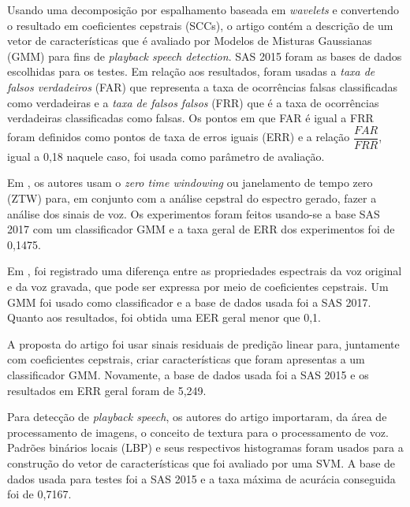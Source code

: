 		\par Usando uma decomposição por espalhamento baseada em \textit{wavelets} e convertendo o resultado em coeficientes cepstrais (SCCs), o artigo \cite{7802552} contém a descrição de um vetor de características que é avaliado por Modelos de Misturas Gaussianas (GMM) para fins de \textit{playback speech detection}. SAS 2015 \cite{SAS2015} foram as bases de dados escolhidas para os testes. Em relação aos resultados, foram usadas a \textit{taxa de falsos verdadeiros} (FAR) que representa a taxa de ocorrências falsas classificadas como verdadeiras e a \textit{taxa de falsos falsos} (FRR) que é a taxa de ocorrências verdadeiras classificadas como falsas. Os pontos em que FAR é igual a FRR foram definidos como pontos de taxa de erros iguais (ERR) e a relação $\dfrac{FAR}{FRR}$, igual a 0,18 naquele caso, foi usada como parâmetro de avaliação.

		\par Em \cite{alluri2019replay}, os autores usam o \textit{zero time windowing} ou janelamento de tempo zero (ZTW) para, em conjunto com a análise cepstral do espectro gerado, fazer a análise dos sinais de voz. Os experimentos foram feitos usando-se a base SAS 2017\cite{SAS2017} com um classificador GMM e a taxa geral de ERR dos experimentos foi de 0,1475.
		
		\par Em \cite{8725688}, foi registrado uma diferença entre as propriedades espectrais da voz original e da voz gravada, que pode ser expressa por meio de coeficientes cepstrais. Um GMM foi usado como classificador e a base de dados usada foi a SAS 2017. Quanto aos resultados, foi obtida uma EER geral menor que 0,1.
	
		\par A proposta do artigo \cite{Hanilci2018} foi usar sinais residuais de predição linear para, juntamente com coeficientes cepstrais, criar características que foram apresentas a um classificador GMM. Novamente, a base de dados usada foi a SAS 2015 e os resultados em ERR geral foram de 5,249.

		\par Para detecção de \textit{playback speech}, os autores do artigo  \cite{ISI:000473343500086} importaram, da área de processamento de imagens, o conceito de textura para o processamento de voz. Padrões binários locais (LBP) e seus respectivos histogramas foram usados para a construção do vetor de características que foi avaliado por uma SVM. A base de dados usada para testes foi a SAS 2015 e a taxa máxima de acurácia conseguida foi de 0,7167.
		
